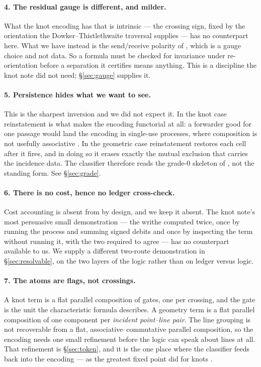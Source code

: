 \documentclass[11pt]{article}
\theoremstyle{plain}
\theoremstyle{definition}
\begin{document}
\paragraph{4. The residual gauge is different, and milder.}
What the knot encoding has that is intrinsic --- the crossing sign, fixed by the orientation the
Dowker--Thistlethwaite traversal supplies --- has no counterpart here. What we have instead is the
send/receive polarity of \cite[\S5]{Geometry}, which is a gauge choice and not data. So a formula
must be checked for invariance under re-orientation before a separation it certifies means
anything. This is a discipline the knot note did not need; \S\ref{sec:gauge} supplies it.

\paragraph{5. Persistence hides what we want to see.}
This is the sharpest inversion and we did not expect it. In the knot case reinstatement is what
makes the encoding functorial at all: a forwarder good for one passage would land the encoding in
single-use processes, where composition is not usefully associative \cite[Rem.~5]{Knots}. In the
geometric case reinstatement restores each cell after it fires, and in doing so it erases exactly
the mutual exclusion that carries the incidence data. The classifier therefore reads the grade-0
skeleton of \cite[\S7]{Geometry}, not the standing form. See \S\ref{sec:grade}.

\paragraph{6. There is no cost, hence no ledger cross-check.}
Cost accounting is absent from \cite{Geometry} by design, and we keep it absent. The knot note's
most persuasive small demonstration --- the writhe computed twice, once by running the process and
summing signed debits and once by inspecting the term without running it, with the two required to
agree \cite[\S4.5]{Classifier} --- has no counterpart available to us. We supply a different
two-route demonstration in \S\ref{sec:resolvable}, on the two layers of the logic rather than on
ledger versus logic.

\paragraph{7. The atoms are flags, not crossings.}
A knot term is a flat parallel composition of gates, one per crossing, and the gate is the unit the
characteristic formula describes. A geometry term is a flat parallel composition of one component
per \emph{incident point--line pair}. The line grouping is not recoverable from a flat,
associative--commutative parallel composition, so the encoding needs one small refinement before
the logic can speak about lines at all. That refinement is \S\ref{sec:token}, and it is the one
place where the classifier feeds back into the encoding --- as the greatest fixed point did for
knots \cite[\S2.3.1]{Classifier}.
\end{document}
